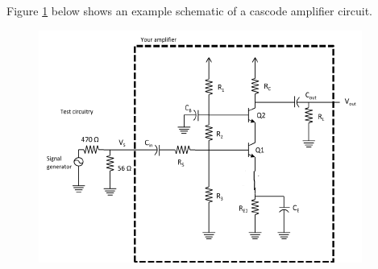 \documentclass{article}
\begin{document}
	\pagebreak		
	Figure \ref{f1} below shows an example schematic of a cascode amplifier circuit.
	\begin{figure}[!ht]
		\centering
		\includegraphics[width=\linewidth]{cascode_schematic.png}
		\label{f1}
	\end{figure}
	\pagebreak
\end{document}
